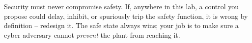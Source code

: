 \documentclass[11pt,a4paper]{article}
\begin{document}
\begin{warnbox}
Security must never compromise safety. If, anywhere in this lab, a control you
propose could delay, inhibit, or spuriously trip the safety function, it is
wrong by definition -- redesign it. The safe state always wins; your job is to
make sure a cyber adversary cannot \emph{prevent} the plant from reaching it.
\end{warnbox}
\end{document}

